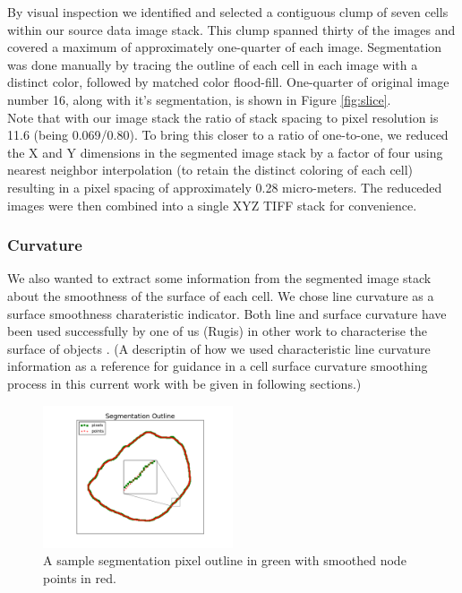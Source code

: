 \documentclass[a4paper,10pt]{article}
\begin{document}
By visual inspection we identified and selected a contiguous clump of seven cells within our source data image stack.  This clump spanned thirty of the images and covered a maximum of approximately one-quarter of each image. Segmentation was done manually by tracing the outline of each cell in each image with a distinct color, followed by matched color flood-fill. One-quarter of original image number 16, along with it's segmentation, is shown in Figure \ref{fig:slice}.\\

Note that with our image stack the ratio of stack spacing to pixel resolution is 11.6 (being 0.069/0.80). To bring this closer to a ratio of one-to-one, we reduced the X and Y dimensions in the segmented image stack by a factor of four using nearest neighbor interpolation (to retain the distinct coloring of each cell) resulting in a pixel spacing of approximately 0.28 micro-meters.  The reduceded images were then combined into a single XYZ TIFF stack for convenience.\\

\subsubsection{Curvature}

We also wanted to extract some information from the segmented image stack about the smoothness of the surface of each cell. We chose line curvature as a surface smoothness charateristic indicator. Both line and surface curvature have been used successfully  by one of us (Rugis) in other work to characterise the surface of objects \cite{Rugis_2005_SCMMD, Rugis_2006_SRMRSD, Rugis_2006_SISCE}. (A descriptin of how we used characteristic line curvature information as a reference for guidance in a cell surface curvature smoothing process in this current work with be given in following sections.)\\

\begin{figure}[H]
\begin{center}
\includegraphics[width=0.5\textwidth]{images/outline.pdf}
\end{center}
\vspace{-5mm}
\caption{A sample segmentation pixel outline in green with smoothed node points in red.}
\label{fig:slice_outline}
\end{figure}
\end{document}
